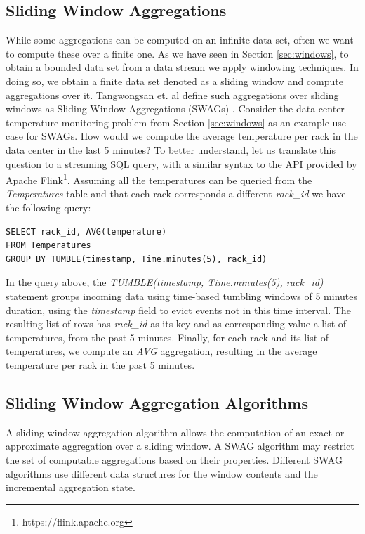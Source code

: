 \subsection{Sliding Window Aggregations}

While some aggregations can be computed on an infinite data set, often we want to compute these over a finite one. As we have seen in Section \ref{sec:windows}, to obtain a bounded data set from a data stream we apply windowing techniques. In doing so, we obtain a finite data set denoted as a sliding window and compute aggregations over it. Tangwongsan et. al define such aggregations over sliding windows as Sliding Window Aggregations (SWAGs) \cite{Tangwongsan-Sliding-Window-Aggregation-Algorithms}. Consider the data center temperature monitoring problem from Section \ref{sec:windows} as an example use-case for SWAGs. How would we compute the average temperature per rack in the data center in the last 5 minutes? To better understand, let us translate this question to a streaming SQL query, with a similar syntax to the API provided by Apache Flink\footnote{https://flink.apache.org}. Assuming all the temperatures can be queried from the \textit{Temperatures} table and that each rack corresponds a different \textit{rack\_id} we have the following query:

\begin{verbatim}
SELECT rack_id, AVG(temperature)
FROM Temperatures
GROUP BY TUMBLE(timestamp, Time.minutes(5), rack_id)
\end{verbatim}

In the query above, the \textit{TUMBLE(timestamp, Time.minutes(5), rack\_id)} statement groups incoming data using time-based tumbling windows of 5 minutes duration, using the \textit{timestamp} field to evict events not in this time interval. The resulting list of rows has \textit{rack\_id} as its key and as corresponding value a list of temperatures, from the past 5 minutes. Finally, for each rack and its list of temperatures, we compute an \textit{AVG} aggregation, resulting in the average temperature per rack in the past 5 minutes.


\subsection{Sliding Window Aggregation Algorithms} \label{sec:back-swag-algs}

A sliding window aggregation algorithm allows the computation of an exact or approximate aggregation over a sliding window. A SWAG algorithm may restrict the set of computable aggregations based on their properties. Different SWAG algorithms use different data structures for the window contents and the incremental aggregation state.


